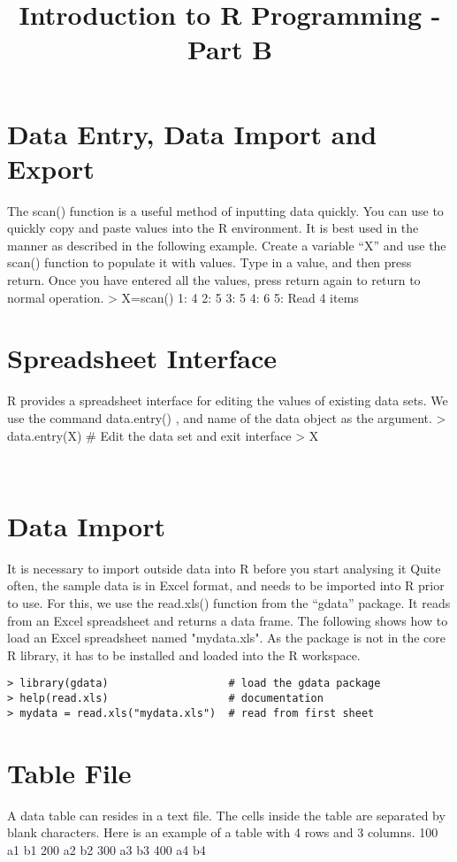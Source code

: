 \documentclass{article}
\title{Introduction to R Programming - Part B}
\date{\vspace{-5ex}}
\begin{document}
\maketitle
\tableofcontents
\section{Data Entry, Data Import and Export}

The scan() function is a useful method of inputting data quickly. You can use to quickly copy and paste values into the R environment.
It is best used in the manner as described in the following example.  Create a variable “X” and use the scan() function to populate it with values.
Type in a value, and then press return.
Once you have entered all the values, press return again to return to normal operation.
> X=scan()
1: 4
2: 5
3: 5
4: 6
5: 
Read 4 items

\section{Spreadsheet Interface}
R provides a spreadsheet interface for editing the values of existing data sets.
We use the command data.entry() , and name of the data object as the argument.
> data.entry(X) # Edit the data set and exit interface
> X

 

\section{Data Import}
It is necessary to import outside data into R before you start analysing it
Quite often, the sample data is in Excel format, and needs to be imported into R prior to use. For this, we use the read.xls() function from the “gdata” package. It reads from an Excel spreadsheet and returns a data frame. The following shows how to load an Excel spreadsheet named "mydata.xls". As the package is not in the core R library, it has to be installed and loaded into the R workspace.
\begin{verbatim}
> library(gdata)                   # load the gdata package 
> help(read.xls)                   # documentation 
> mydata = read.xls("mydata.xls")  # read from first sheet
\end{verbatim}

\section{Table File}
 A data table can resides in a text file. The cells inside the table are separated by blank characters. Here is an example of a table with 4 rows and 3 columns.
100   a1   b1 
200   a2   b2 
300   a3   b3 
400   a4   b4 
 
\end{document}
